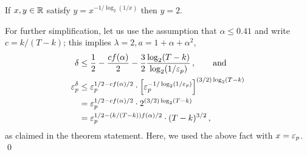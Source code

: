   \begin{fact*}
    If $x,y \in \mathbb{R}$ satisfy $y = x^{-1/\log_2(1/x)}$ then $y = 2$.
  \end{fact*}
  \noindent
  For further simplification, let us use the assumption that $\alpha \leq 0.41$ 
  and write $c = k/(T-k)$; 
  this implies $\lambda = 2, a = 1 + \alpha + \alpha^2$, 
  \begin{align*}
    \delta
      &\leq \frac{1}{2} - \frac{c f(\alpha)}{2} - \frac{3}{2} \frac{ \log_2(T - k)}{\log_2(1/\mathsf{\varepsilon}_p)}\,, 
      \qquad \text{and}\\
    \mathsf{\varepsilon}_p^\delta  
      &\leq \mathsf{\varepsilon}_p^{1/2 - c f(\alpha)/2} \cdot \left[ \mathsf{\varepsilon}_p^{-1/\log_2(1/\mathsf{\varepsilon}_p)} \right]^{(3/2)\log_2(T - k)} \\
      &= \mathsf{\varepsilon}_p^{1/2 - c f(\alpha)/2} \cdot 2^{(3/2)\log_2(T - k)} \\
      &= \mathsf{\varepsilon}_p^{1/2 - (k/(T-k)) f(\alpha)/2} \cdot (T - k)^{3/2} 
      \,,
  \end{align*}
  as claimed in the theorem statement. 
  Here, we used the above fact with $x = \mathsf{\varepsilon}_p$.  
\hfill\qed

